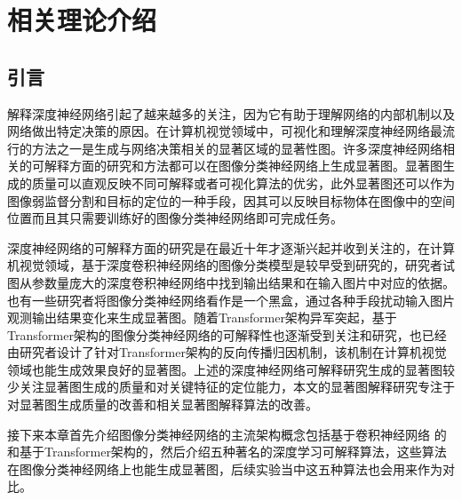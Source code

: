 


\chapter{相关理论介绍
}
\thispagestyle{others}
\pagestyle{others}
\xiaosi

\section{引言}
解释深度神经网络引起了越来越多的关注，因为它有助于理解网络的内部机制以及网络做出特定决策的原因。在计算机视觉领域中，可视化和理解深度神经网络最流行的方法之一是生成与网络决策相关的显著区域的显著性图。许多深度神经网络相关的可解释方面的研究和方法都可以在图像分类神经网络上生成显著图。显著图生成的质量可以直观反映不同可解释或者可视化算法的优劣，此外显著图还可以作为图像弱监督分割和目标的定位的一种手段，因其可以反映目标物体在图像中的空间位置而且其只需要训练好的图像分类神经网络即可完成任务。


深度神经网络的可解释方面的研究是在最近十年才逐渐兴起并收到关注的，在计算机视觉领域，基于深度卷积神经网络的图像分类模型是较早受到研究的，研究者试图从参数量庞大的深度卷积神经网络中找到输出结果和在输入图片中对应的依据。也有一些研究者将图像分类神经网络看作是一个黑盒，通过各种手段扰动输入图片观测输出结果变化来生成显著图。随着Transformer架构异军突起，基于Transformer架构的图像分类神经网络的可解释性也逐渐受到关注和研究，也已经由研究者设计了针对Transformer架构的反向传播归因机制，该机制在计算机视觉领域也能生成效果良好的显著图。上述的深度神经网络可解释研究生成的显著图较少关注显著图生成的质量和对关键特征的定位能力，本文的显著图解释研究专注于对显著图生成质量的改善和相关显著图解释算法的改善。

接下来本章首先介绍图像分类神经网络的主流架构概念包括基于卷积神经网络 的和基于Transformer架构的，然后介绍五种著名的深度学习可解释算法，这些算法在图像分类神经网络上也能生成显著图，后续实验当中这五种算法也会用来作为对比。

